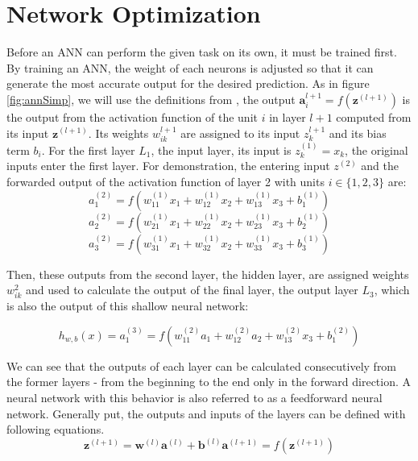 \section{Network Optimization} \label{methods}
Before an ANN can perform the given task on its own, it must be trained first. By training an ANN, the weight of each neurons is adjusted so that it can generate the most accurate output for the desired prediction. As in figure \ref{fig:annSimp}, we will use the definitions from \cite{autoencoderSparse}, the output $\bm{a}_i^{l+1} = f(\bm{z}^{(l+1)})$ is the output from the activation function of the unit $i$ in layer $l+1$ computed from its input $\bm{z}^{(l+1)}$. Its weights $w_{ik}^{l+1}$ are assigned to its input $z^{l+1}_k$ and its bias term $b_i$. For the first layer $L_1$, the input layer, its input is $z^{(1)}_k = x_k$, the original inputs enter the first layer. For demonstration, the entering input $z^{(2)}$ and the forwarded output of the activation function of layer 2 with units $i \in \{1, 2, 3\}$ are:
	\begin{equation} \label{eq:act1L2} 
		a_1^{(2)} = f(w_{11}^{(1)}x_1 + w_{12}^{(1)}x_2 + w_{13}^{(1)}x_3 + b_1^{(1)})
	\end{equation} 
	\begin{equation} \label{eq:act2L2} 
		a_2^{(2)} = f(w_{21}^{(1)}x_1 + w_{22}^{(1)}x_2 + w_{23}^{(1)}x_3 + b_2^{(1)})
	\end{equation} 
	\begin{equation} \label{eq:act3L2} 
		a_3^{(2)} = f(w_{31}^{(1)}x_1 + w_{32}^{(1)}x_2 + w_{33}^{(1)}x_3 + b_3^{(1)})
	\end{equation} 

Then, these outputs from the second layer, the hidden layer, are assigned weights $w_{ik}^{2}$ and used to calculate the output of the final layer, the output layer $L_3$, which is also the output of this shallow neural network: 

	\begin{equation} \label{eq:output3ANN} 
		h_{w, b}(x) = a_1^{(3)} = f(w_{11}^{(2)}a_1 + w_{12}^{(2)}a_2 + w_{13}^{(2)}x_3 + b_1^{(2)})
	\end{equation} 

We can see that the outputs of each layer can be calculated consecutively from the former layers - from the beginning to the end only in the forward direction. A neural network with this behavior is also referred to as a feedforward neural network. Generally put, the outputs and inputs of the layers can be defined with following equations.
	\begin{equation} \label{eq:outputsANN} 
		\bm{z}^{(l+1)} = \bm{w}^{(l)}\bm{a}^{(l)} + \bm{b}^{(l)}
		\bm{a}^{(l+1)} = f(\bm{z}^{(l+1)})
	\end{equation} 

